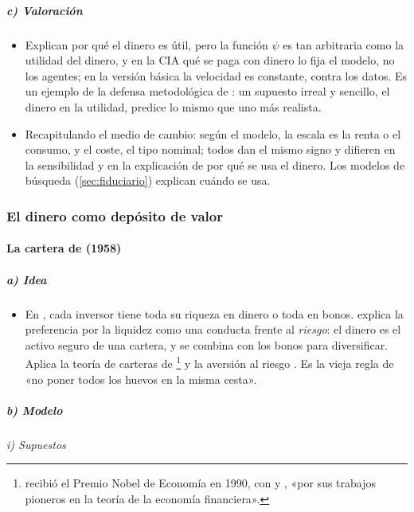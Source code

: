 \documentclass[11pt]{article}
\begin{document}
\subparagraph{c) Valoración}

\begin{itemize}
\item Explican por qué el dinero es útil, pero la función $\psi$ es tan arbitraria como la utilidad del dinero, y en la CIA qué se paga con dinero lo fija el modelo, no los agentes; en la versión básica la velocidad es constante, contra los datos. Es un ejemplo de la defensa metodológica de \textcite{Friedman1953Methodology}: un supuesto irreal y sencillo, el dinero en la utilidad, predice lo mismo que uno más realista.
\item Recapitulando el medio de cambio: según el modelo, la escala es la renta o el consumo, y el coste, el tipo nominal; todos dan el mismo signo y difieren en la sensibilidad y en la explicación de por qué se usa el dinero. Los modelos de búsqueda (\ref{sec:fiduciario}) explican cuándo se usa.
\end{itemize}

\subsubsection{El dinero como depósito de valor}\label{sec:deposito-valor}

\paragraph{La cartera de  (1958)}

\subparagraph{a) Idea}

\begin{itemize}
\item En , cada inversor tiene toda su riqueza en dinero o toda en bonos. \textcite{Tobin1958Liquidity} explica la preferencia por la liquidez como una conducta frente al \emph{riesgo}: el dinero es el activo seguro de una cartera, y se combina con los bonos para diversificar. Aplica la teoría de carteras de \footnote{ recibió el Premio Nobel de Economía en 1990, con  y , «por sus trabajos pioneros en la teoría de la economía financiera»\nocite{Nobel1990Markowitz}.}  y la aversión al riesgo . Es la vieja regla de «no poner todos los huevos en la misma cesta».
\end{itemize}

\subparagraph{b) Modelo}

\hspace*{3.6em}\emph{i) Supuestos}
\end{document}

